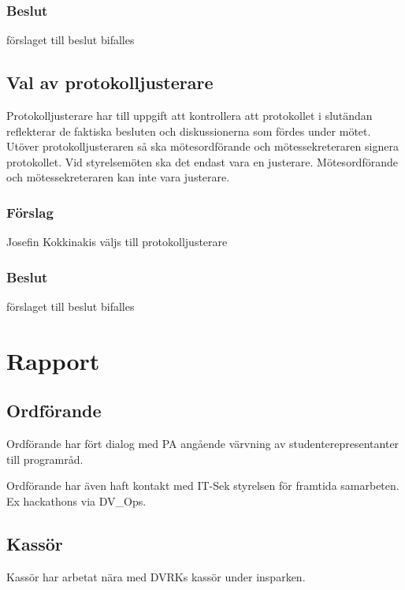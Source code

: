 \documentclass[protokoll]{dvd}
\begin{document}
\subsubsection*{Beslut}
\begin{attsatser}
    \item förslaget till beslut bifalles
\end{attsatser}

\subsection{Val av protokolljusterare}

Protokolljusterare har till uppgift att kontrollera att protokollet i slutändan reflekterar de faktiska besluten och diskussionerna som fördes under mötet.
Utöver protokolljusteraren så ska mötesordförande och mötessekreteraren signera protokollet.
Vid styrelsemöten ska det endast vara en justerare.
Mötesordförande och mötessekreteraren kan inte vara justerare.

\subsubsection*{Förslag}
\begin{attsatser}
    \item Josefin Kokkinakis väljs till protokolljusterare
\end{attsatser}
\subsubsection*{Beslut}
\begin{attsatser}
    \item förslaget till beslut bifalles
\end{attsatser}

\section{Rapport} 
\subsection{Ordförande}
Ordförande har fört dialog med PA angående värvning av studenterepresentanter till programråd. 

Ordförande har även haft kontakt med IT-Sek styrelsen för framtida samarbeten. Ex hackathons via DV\_Ops.  

\subsection{Kassör}
Kassör har arbetat nära med DVRKs kassör under insparken.
\end{document}
